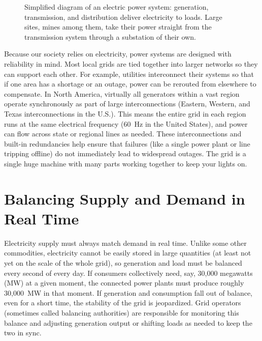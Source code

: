 \begin{figure}[h]
    \centering
    \resizebox{\textwidth}{!}{}
    \caption{Simplified diagram of an electric power system: generation, transmission, and distribution deliver electricity to loads. Large sites, mines among them, take their power straight from the transmission system through a substation of their own.}
    \label{fig:power_system}
\end{figure}

Because our society relies on electricity, power systems are designed with reliability in mind. Most local grids are tied together into larger networks so they can support each other. For example, utilities interconnect their systems so that if one area has a shortage or an outage, power can be rerouted from elsewhere to compensate. In North America, virtually all generators within a vast region operate synchronously as part of large interconnections (Eastern, Western, and Texas interconnections in the U.S.). This means the entire grid in each region runs at the same electrical frequency (60~Hz in the United States), and power can flow across state or regional lines as needed. These interconnections and built-in redundancies help ensure that failures (like a single power plant or line tripping offline) do not immediately lead to widespread outages. The grid is a single huge machine with many parts working together to keep your lights on.

\section{Balancing Supply and Demand in Real Time}

Electricity supply must always match demand in real time. Unlike some other commodities, electricity cannot be easily stored in large quantities (at least not yet on the scale of the whole grid), so generation and load must be balanced every second of every day. If consumers collectively need, say, 30,000 megawatts (MW) at a given moment, the connected power plants must produce roughly 30,000~MW in that moment. If generation and consumption fall out of balance, even for a short time, the stability of the grid is jeopardized. Grid operators (sometimes called balancing authorities) are responsible for monitoring this balance and adjusting generation output or shifting loads as needed to keep the two in sync.

